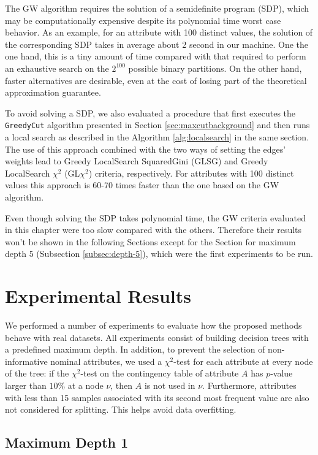 The GW algorithm  requires  the solution of a semidefinite program (SDP),
which may be computationally expensive despite  its 
polynomial time worst case  behavior.
As an example, for an attribute with 100 distinct values, the solution of
the corresponding SDP takes in average about 2 second in our machine.
One the one hand, this is a tiny amount of time 
compared with that required to perform an exhaustive search on the $2^{100}$
possible binary partitions. On the other hand, 
 faster alternatives are desirable, even
at the cost of losing part of the theoretical approximation guarantee. 

To avoid solving a SDP, 
we also evaluated a procedure
that first executes the {\tt GreedyCut} algorithm presented
in Section \ref{sec:maxcutbackground} and then runs a local search as described
in the Algorithm  \ref{alg:localsearch} in the same section. 
The use of this approach combined with the two
ways of setting the edges' weights lead to
 Greedy LocalSearch SquaredGini (GLSG) and 
Greedy LocalSearch $\chi^2$ (GL$\chi^2$) 
criteria, respectively.
For attributes with 100 distinct values this approach is 60-70
times faster than the one based on the GW algorithm.

Even though solving the SDP takes polynomial time, the GW criteria evaluated in this chapter were too slow compared with the others. Therefore their results won't be shown in the following Sections except for the Section for maximum depth 5 (Subsection \ref{subsec:depth-5}), which were the first experiments to be run.


\section{Experimental Results}

We performed a number of experiments to evaluate how the
proposed methods behave with real datasets.
All experiments consist of building decision trees
with a predefined maximum depth.  In addition,
to prevent the selection of non-informative nominal attributes, 
we used a $\chi^2$-test for each attribute at every node of
the tree: if the $\chi^2$-test  on the contingency table of attribute $A$
has $p$-value larger than $10\%$ at a node $\nu$, then
$A$ is not used in $\nu$. Furthermore, attributes with less than 15 samples associated with its
second most frequent value are also not considered for splitting. This helps  avoid data overfitting.


\subsection{Maximum Depth 1}

